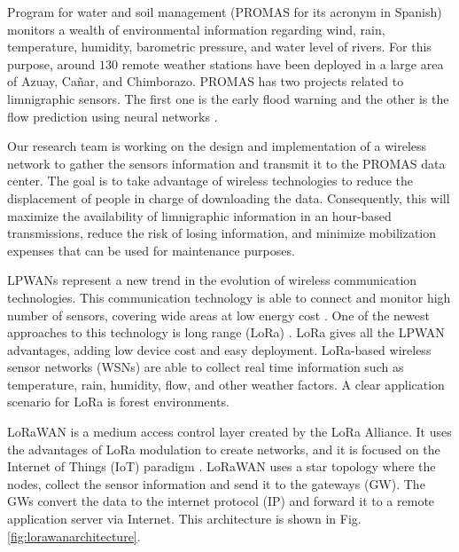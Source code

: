 Program for water and soil management (PROMAS for its acronym in Spanish) monitors a wealth of environmental information regarding wind, rain, temperature, humidity, barometric pressure, and water level of rivers. For this purpose, around $130$ remote weather stations have been deployed in a large area of Azuay, Cañar, and Chimborazo. PROMAS has two projects related to limnigraphic sensors. The first one is the early flood warning and the other is the flow prediction using neural networks \cite{felipeartificial}.

Our research team is working on the design and implementation of a wireless network to gather the sensors information and transmit it to the PROMAS data center. The goal is to take advantage of wireless technologies to reduce the displacement of people in charge of downloading the data. Consequently, this will maximize the availability of limnigraphic information in an hour-based transmissions, reduce the risk of losing information, and minimize mobilization expenses that can be used for maintenance purposes.



LPWANs represent a new trend in the evolution of wireless communication technologies. This communication technology is able to connect and monitor high number of sensors, covering wide areas at low energy cost \cite{Augustin2016}. One of the newest approaches to this technology is long range (LoRa) \cite{Semtech2015}. LoRa gives all the LPWAN advantages, adding low device cost and easy deployment. LoRa-based wireless sensor networks (WSNs) are able to collect real time information such as temperature, rain, humidity, flow, and other weather factors. A clear application scenario for LoRa is forest environments.%


LoRaWAN is a medium access control layer created by the LoRa Alliance. It uses the advantages of LoRa modulation to create networks, and it is focused on the Internet of Things (IoT) paradigm \cite{Wixted2017}. LoRaWAN uses a star topology where the nodes, collect the sensor information and send it to the gateways (GW). The GWs convert the data to the internet protocol (IP) and forward it to a remote application server via Internet. This architecture is shown in Fig. \ref{fig:lorawanarchitecture}.

